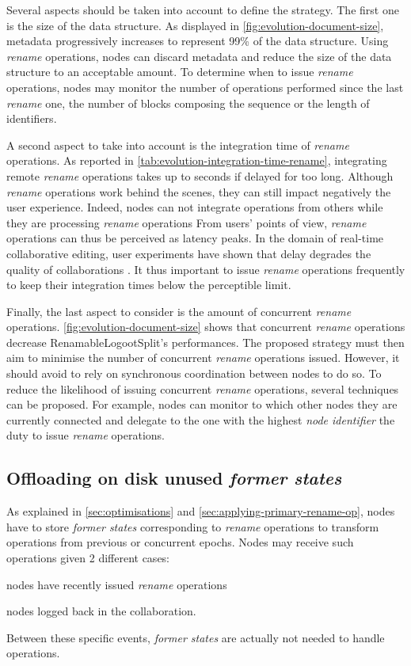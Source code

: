 \documentclass[10pt,journal,compsoc]{IEEEtran}
\begin{document}
Several aspects should be taken into account to define the strategy.
The first one is the size of the data structure.
As displayed in \autoref{fig:evolution-document-size}, metadata progressively increases to represent 99\% of the data structure.
Using \emph{rename} operations, nodes can discard metadata and reduce the size of the data structure to an acceptable amount.
To determine when to issue \emph{rename} operations, nodes may monitor the number of operations performed since the last \emph{rename} one, the number of blocks composing the sequence or the length of identifiers.

A second aspect to take into account is the integration time of \emph{rename} operations.
As reported in \autoref{tab:evolution-integration-time-rename}, integrating remote \emph{rename} operations takes up to seconds if delayed for too long.
Although \emph{rename} operations work behind the scenes, they can still impact negatively the user experience.
Indeed, nodes can not integrate operations from others while they are processing \emph{rename} operations
From users' points of view, \emph{rename} operations can thus be perceived as latency peaks.
In the domain of real-time collaborative editing, user experiments have shown that delay degrades the quality of collaborations \cite{ignat:hal-01088815,ignat:hal-01238831}.
It thus important to issue \emph{rename} operations frequently to keep their integration times below the perceptible limit.

Finally, the last aspect to consider is the amount of concurrent \emph{rename} operations.
\autoref{fig:evolution-document-size} shows that concurrent \emph{rename} operations decrease RenamableLogootSplit's performances.
The proposed strategy must then aim to minimise the number of concurrent \emph{rename} operations issued.
However, it should avoid to rely on synchronous coordination between nodes to do so.
To reduce the likelihood of issuing concurrent \emph{rename} operations, several techniques can be proposed.
For example, nodes can monitor to which other nodes they are currently connected and delegate to the one with the highest \emph{node identifier} the duty to issue \emph{rename} operations.

\subsection{Offloading on disk unused \emph{former states}}
\label{sec:offloading-former-states}

As explained in \autoref{sec:optimisations} and \autoref{sec:applying-primary-rename-op}, nodes have to store \emph{former states} corresponding to \emph{rename} operations to transform operations from previous or concurrent epochs.
Nodes may receive such operations given 2 different cases:
\begin{enumerate*}[label=(\roman*)]
    \item nodes have recently issued \emph{rename} operations
    \item nodes logged back in the collaboration.
\end{enumerate*}
Between these specific events, \emph{former states} are actually not needed to handle operations.
\end{document}
